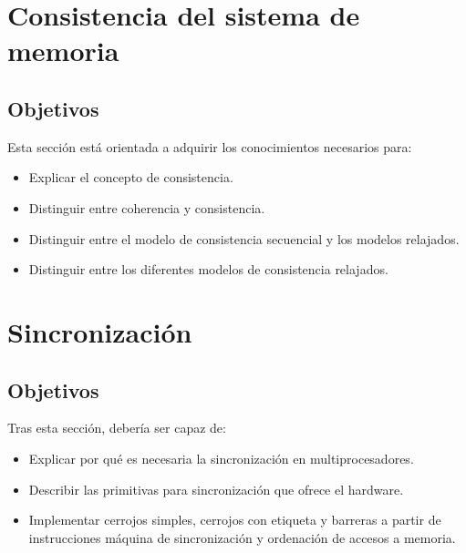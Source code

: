 \section{Consistencia del sistema de memoria}
\subsection{Objetivos}
Esta sección está orientada a adquirir los conocimientos necesarios para:
\begin{itemize}
    \item Explicar el concepto de consistencia.
    \item Distinguir entre coherencia y consistencia.
    \item Distinguir entre el modelo de consistencia secuencial y los modelos relajados.
    \item Distinguir entre los diferentes modelos de consistencia relajados.
\end{itemize}

\section{Sincronización}
\subsection{Objetivos}
Tras esta sección, debería ser capaz de:
\begin{itemize}
    \item Explicar por qué es necesaria la sincronización en multiprocesadores.
    \item Describir las primitivas para sincronización que ofrece el hardware.
    \item Implementar cerrojos simples, cerrojos con etiqueta y barreras a partir de instrucciones máquina de sincronización y ordenación de accesos a memoria.
\end{itemize}
